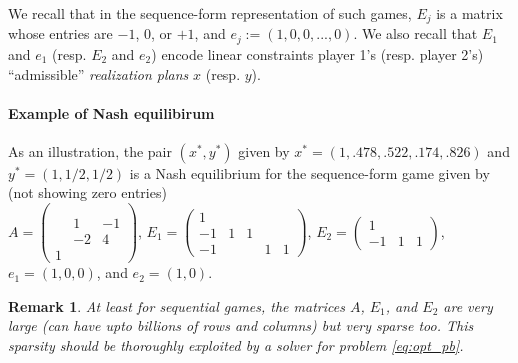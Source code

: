 \documentclass{article} %
\newtheorem{remark}{Remark}
\begin{document}
We recall that in the sequence-form representation of such games,  $E_j$ is a matrix whose
entries are $-1$, $0$, or $+1$, and $e_j := (1, 0, 0, ..., 0)$. We also recall that $E_1$ and $e_1$ (resp. $E_2$ and $e_2$)
encode linear constraints player 1's (resp. player 2's)  ``admissible'' \textit{realization plans} $x$ (resp. $y$).

\paragraph{Example of Nash equilibirum}
As an illustration, the pair $(x^*, y^*)$ given by
$x^* = (1, .478, .522, .174, .826)$ and
$y^* = (1, 1/2, 1/2)$ is a Nash equilibrium for the sequence-form game given by (not showing zero entries)\\
$A = \left(\begin{array}{ccc}
  &   &  \\
  &   &  \\
  & 1 & -1\\
  & -2 & 4\\
1 &   &  
\end{array}\right)$, $E_1 = \left(\begin{array}{ccccc}
  1 &   &   &   &  \\
  -1 & 1 & 1 &   &  \\
  -1 &   &   & 1 & 1
\end{array}\right)$,
$E_2 = \left(\begin{array}{ccc}
  1 &   &  \\
  -1 & 1 & 1
\end{array}\right)$, $e_1 = (1, 0, 0)$, and $e_2 = (1, 0)$.

\begin{remark}
  At least for sequential games, the matrices $A$, $E_1$, and $E_2$ are very large (can have upto billions of rows and columns) but very sparse too.
This sparsity should be thoroughly exploited by a solver for problem \eqref{eq:opt_pb}.
\end{remark}
\end{document}

